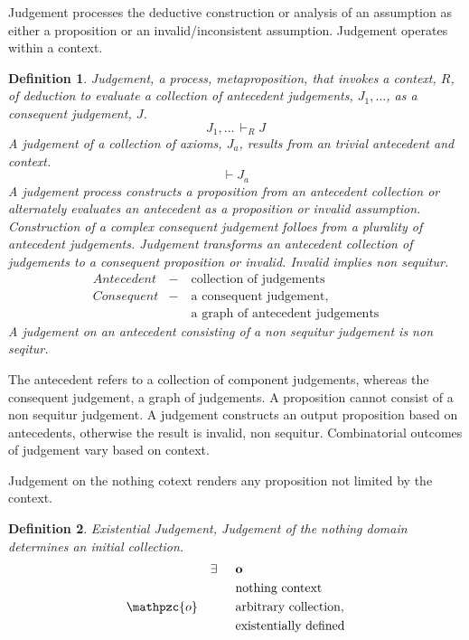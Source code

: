 \documentclass[aps,twocolumn,secnumarabic,nobalancelastpage,amsmath,amssymb,
amsthm,nofootinbib,parskip=full]{revtex4}
\numberwithin{equation}{section}
\newtheorem{definition}{Definition}[section]
\newcommand{\obk}[1]{\mathpzc{#1}}
\newcommand{\catN}[1]{\mathbf{\large #1}}
\begin{document}
Judgement processes the deductive construction or analysis of an
assumption as either a proposition or an invalid/inconsistent assumption.
Judgement operates within a context.

\begin{definition}{Judgement}\label{def:judgement},
  a process, metaproposition, that invokes a context, $R$, of deduction
  to evaluate a collection of antecedent
  judgements, $J_1,\dots$, as a consequent judgement, $J$.
  \begin{equation*}
  J_1,\dots\,\vdash_R J
\end{equation*}
  A judgement of a collection of axioms, $J_a$,
  results from an trivial antecedent and context.
\begin{equation*}
  \vdash J_a
\end{equation*}  
  A judgement process constructs a proposition from an antecedent collection or
  alternately evaluates an antecedent as a proposition or invalid assumption.
  Construction of a complex consequent judgement folloes from a plurality of
  antecedent judgements.
  Judgement transforms an antecedent collection of judgements to a consequent
  proposition or invalid. Invalid implies non sequitur.
  \begin{equation*}
  \begin{array}{rll}
   Antecedent&-&\text{collection of judgements} \\[3pt]
   Consequent&-&\text{a consequent judgement,} \\[3pt]
     &\quad&\text{a graph of antecedent judgements}
  \end{array}
  \end{equation*}
  A judgement on an antecedent consisting of a non sequitur judgement
  is non seqitur.
\end{definition}

The antecedent refers to a collection of component judgements,
whereas the consequent judgement, a graph of judgements.
A proposition cannot consist of a non sequitur judgement.
A judgement constructs an output proposition based
on antecedents, otherwise the result is invalid, non sequitur.
Combinatorial outcomes of judgement vary based on context.

Judgement on the nothing cotext renders any proposition not limited by
the context.

\begin{definition}{Existential Judgement}\label{def:existentialjudgement},
  Judgement of the nothing domain determines an initial collection.
  \begin{equation*}
  \begin{array}{rll}
   &\exists&\catN{o} \\[3pt]
   &\quad&\text{nothing context} \\[3pt]
   \obk{o}&\quad&\text{arbitrary collection,} \\[3pt]
    &&\text{existentially defined}
  \end{array}
  \end{equation*}
\end{definition}
\end{document}
